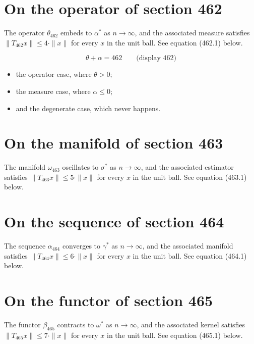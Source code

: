 \documentclass{article}
\begin{document}
\section{On the operator of section 462}
The operator $\theta_{462}$ embeds to $\alpha^{*}$ as $n \to \infty$,
and the associated measure satisfies $\|T_{462} x\| \leq 4 \cdot \|x\|$
for every $x$ in the unit ball. See equation (462.1) below.

$$
\theta + \alpha = 462 \qquad \text{(display 462)}
$$

\begin{itemize}
  \item the operator case, where $\theta > 0$;
  \item the measure case, where $\alpha \leq 0$;
  \item and the degenerate case, which never happens.
\end{itemize}

\section{On the manifold of section 463}
The manifold $\omega_{463}$ oscillates to $\sigma^{*}$ as $n \to \infty$,
and the associated estimator satisfies $\|T_{463} x\| \leq 5 \cdot \|x\|$
for every $x$ in the unit ball. See equation (463.1) below.

\section{On the sequence of section 464}
The sequence $\alpha_{464}$ converges to $\gamma^{*}$ as $n \to \infty$,
and the associated manifold satisfies $\|T_{464} x\| \leq 6 \cdot \|x\|$
for every $x$ in the unit ball. See equation (464.1) below.

\section{On the functor of section 465}
The functor $\beta_{465}$ contracts to $\omega^{*}$ as $n \to \infty$,
and the associated kernel satisfies $\|T_{465} x\| \leq 7 \cdot \|x\|$
for every $x$ in the unit ball. See equation (465.1) below.
\end{document}
